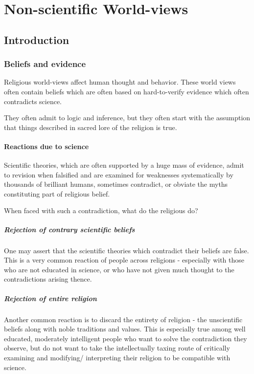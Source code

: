 \documentclass[oneside, article]{memoir}
\begin{document}
\part{Non-scientific World-views}
\chapter{Introduction}
\section{Beliefs and evidence}
Religious world-views affect human thought and behavior. These world views often contain beliefs which are often based on hard-to-verify evidence which often contradicts science.

They often admit to logic and inference, but they often start with the assumption that things described in sacred lore of the religion is true.

\subsection{Reactions due to science}
Scientific theories, which are often supported by a huge mass of evidence, admit to revision when falsified and are examined for weaknesses systematically by thousands of brilliant humans, sometimes contradict, or obviate the myths constituting part of religious belief.

When faced with such a contradiction, what do the religious do?

\subsubsection{Rejection of contrary scientific beliefs}
One may assert that the scientific theories which contradict their beliefs are false. This is a very common reaction of people across religions - especially with those who are not educated in science, or who have not given much thought to the contradictions arising thence.

\subsubsection{Rejection of entire religion}
Another common reaction is to discard the entirety of religion - the unscientific beliefs along with noble traditions and values. This is especially true among well educated, moderately intelligent people who want to solve the contradiction they observe, but do not want to take the intellectually taxing route of critically examining and modifying/ interpreting their religion to be compatible with science.
\end{document}
